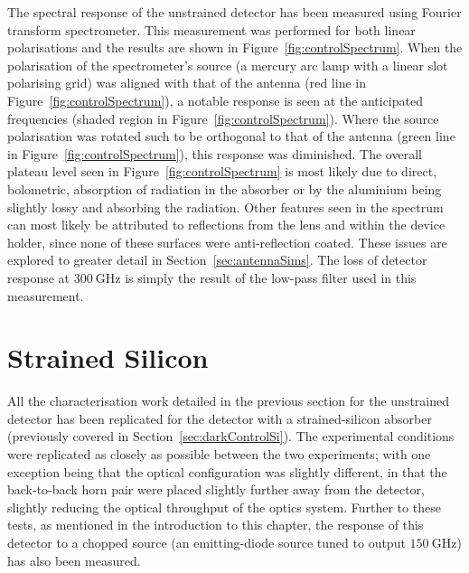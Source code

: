 The spectral response of the unstrained detector has been measured using Fourier transform spectrometer. This measurement was performed for both linear polarisations and the results are shown in Figure~\ref{fig:controlSpectrum}. When the polarisation of the spectrometer's source (a mercury arc lamp with a linear slot polarising grid) was aligned with that of the antenna (red line in Figure~\ref{fig:controlSpectrum}), a notable response is seen at the anticipated frequencies (shaded region in Figure~\ref{fig:controlSpectrum}). Where the source polarisation was rotated such to be orthogonal to that of the antenna (green line in Figure~\ref{fig:controlSpectrum}), this response was diminished. The overall plateau level seen in Figure~\ref{fig:controlSpectrum} is most likely due to direct, bolometric, absorption of radiation in the absorber or by the aluminium being slightly lossy and absorbing the radiation. Other features seen in the spectrum can most likely be attributed to reflections from the lens and within the device holder, since none of these surfaces were anti-reflection coated. These issues are explored to greater detail in Section~\ref{sec:antennaSims}. The loss of detector response at $300~\mathrm{GHz}$ is simply the result of the low-pass filter used in this measurement. 
%
\section{Strained Silicon}\label{sec:opticalStrainedSi}
All the characterisation work detailed in the previous section for the unstrained detector has been replicated for the detector with a strained-silicon absorber (previously covered in Section~\ref{sec:darkControlSi}). The experimental conditions were replicated as closely as possible between the two experiments; with one exception being that the optical configuration was slightly different, in that the back-to-back horn pair were placed slightly further away from the detector, slightly reducing the optical throughput of the optics system. Further to these tests, as mentioned in the introduction to this chapter, the response of this detector to a chopped source (an emitting-diode source tuned to output $150~\mathrm{GHz}$) has also been measured.
%

